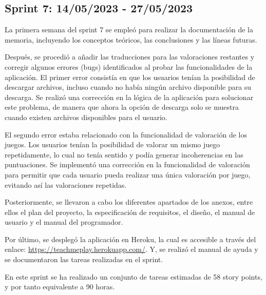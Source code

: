 \subsection{Sprint 7: 14/05/2023 - 27/05/2023}
La primera semana del sprint 7 se empleó para realizar la documentación de la memoria, incluyendo los conceptos teóricos, las conclusiones y las líneas futuras.

Después, se procedió a añadir las traducciones para las valoraciones restantes y corregir algunos errores (bugs) identificados al probar las funcionalidades de la aplicación. 
El primer error consistía en que los usuarios tenían la posibilidad de descargar archivos, incluso cuando no había ningún archivo disponible para su descarga. Se realizó una corrección en la lógica de la aplicación para solucionar este problema, de manera que ahora la opción de descarga solo se muestra cuando existen archivos disponibles para el usuario.

El segundo error estaba relacionado con la funcionalidad de valoración de los juegos. Los usuarios tenían la posibilidad de valorar un mismo juego repetidamente, lo cual no tenía sentido y podía generar incoherencias en las puntuaciones. Se implementó una corrección en la funcionalidad de valoración para permitir que cada usuario pueda realizar una única valoración por juego, evitando así las valoraciones repetidas.

Posteriormente, se llevaron a cabo los diferentes apartados de los anexos, entre ellos el plan del proyecto, la especificación de requisitos, el diseño, el manual de usuario y el manual del programador.

Por último, se desplegó la aplicación en Heroku, la cual es accesible a través del enlace: \url{https://teachmeplay.herokuapp.com/}. Y, se realizó el manual de ayuda y se documentaron las tareas realizadas en el sprint.

En este sprint se ha realizado un conjunto de tareas estimadas de 58 story points, y por tanto equivalente a 90 horas.

